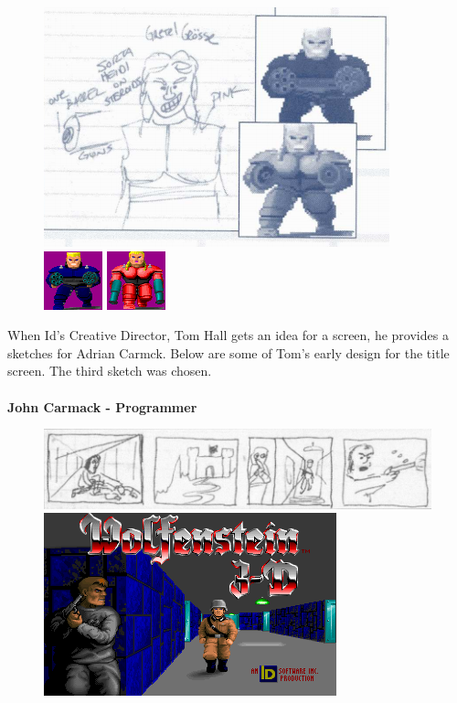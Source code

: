 \documentclass[book.tex]{subfiles}
\begin{document}
   \begin{figure}[H]
\centering
 \includegraphics[scale=0.8]{imgs/tom_hall_sketch_gretel.png}\\
 \includegraphics[scale=2.5]{imgs/sprites/hans_grosse.png}
 \includegraphics[scale=5]{imgs/sprites/gretel_hanse.png}
 \end{figure}
 
 \begin{fancyquotes}
When Id's Creative Director, Tom Hall gets an idea for a screen, he provides a sketches for Adrian Carmck. Below are some of Tom's early design for the title screen. The third sketch was chosen.\\
\\
\textbf{John Carmack - Programmer}
\end{fancyquotes}

   \begin{figure}[H]
\centering
 \includegraphics[scale=0.5]{imgs/tom_hall_sketch_intro_screen_genesis.png}
 \par
 \includegraphics[scale=2]{imgs/sprites/woldf3d.png}
 \end{figure}
 
\end{document}
